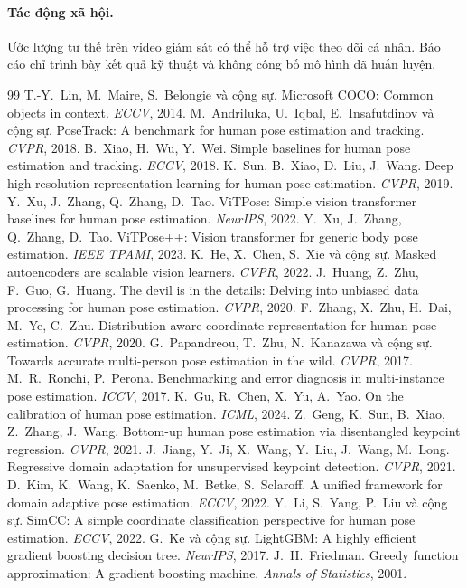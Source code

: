 \documentclass[11pt,a4paper]{article}
\begin{document}
\paragraph{Tác động xã hội.} Ước lượng tư thế trên video giám sát có thể hỗ trợ việc theo dõi cá nhân. Báo cáo chỉ trình bày kết quả kỹ thuật và không công bố mô hình đã huấn luyện.

\begin{thebibliography}{99}\small
{} T.-Y.~Lin, M.~Maire, S.~Belongie và cộng sự. Microsoft COCO: Common objects in context. \textit{ECCV}, 2014.
 M.~Andriluka, U.~Iqbal, E.~Insafutdinov và cộng sự. PoseTrack: A benchmark for human pose estimation and tracking. \textit{CVPR}, 2018.
 B.~Xiao, H.~Wu, Y.~Wei. Simple baselines for human pose estimation and tracking. \textit{ECCV}, 2018.
 K.~Sun, B.~Xiao, D.~Liu, J.~Wang. Deep high-resolution representation learning for human pose estimation. \textit{CVPR}, 2019.
 Y.~Xu, J.~Zhang, Q.~Zhang, D.~Tao. ViTPose: Simple vision transformer baselines for human pose estimation. \textit{NeurIPS}, 2022.
 Y.~Xu, J.~Zhang, Q.~Zhang, D.~Tao. ViTPose++: Vision transformer for generic body pose estimation. \textit{IEEE TPAMI}, 2023.
 K.~He, X.~Chen, S.~Xie và cộng sự. Masked autoencoders are scalable vision learners. \textit{CVPR}, 2022.
 J.~Huang, Z.~Zhu, F.~Guo, G.~Huang. The devil is in the details: Delving into unbiased data processing for human pose estimation. \textit{CVPR}, 2020.
 F.~Zhang, X.~Zhu, H.~Dai, M.~Ye, C.~Zhu. Distribution-aware coordinate representation for human pose estimation. \textit{CVPR}, 2020.
 G.~Papandreou, T.~Zhu, N.~Kanazawa và cộng sự. Towards accurate multi-person pose estimation in the wild. \textit{CVPR}, 2017.
 M.~R.~Ronchi, P.~Perona. Benchmarking and error diagnosis in multi-instance pose estimation. \textit{ICCV}, 2017.
 K.~Gu, R.~Chen, X.~Yu, A.~Yao. On the calibration of human pose estimation. \textit{ICML}, 2024.
 Z.~Geng, K.~Sun, B.~Xiao, Z.~Zhang, J.~Wang. Bottom-up human pose estimation via disentangled keypoint regression. \textit{CVPR}, 2021.
 J.~Jiang, Y.~Ji, X.~Wang, Y.~Liu, J.~Wang, M.~Long. Regressive domain adaptation for unsupervised keypoint detection. \textit{CVPR}, 2021.
 D.~Kim, K.~Wang, K.~Saenko, M.~Betke, S.~Sclaroff. A unified framework for domain adaptive pose estimation. \textit{ECCV}, 2022.
 Y.~Li, S.~Yang, P.~Liu và cộng sự. SimCC: A simple coordinate classification perspective for human pose estimation. \textit{ECCV}, 2022.
 G.~Ke và cộng sự. LightGBM: A highly efficient gradient boosting decision tree. \textit{NeurIPS}, 2017.
 J.~H.~Friedman. Greedy function approximation: A gradient boosting machine. \textit{Annals of Statistics}, 2001.
\end{thebibliography}
\end{document}
